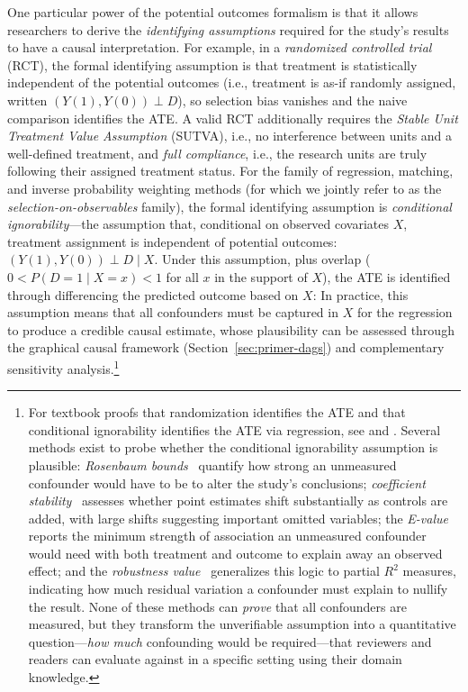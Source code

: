 One particular power of the potential outcomes formalism is that it allows researchers to derive the \emph{identifying assumptions} required for the study's results to have a causal interpretation.
For example, in a \emph{randomized controlled trial} (RCT), the formal identifying assumption is that treatment is statistically independent of the potential outcomes (i.e., treatment is as-if randomly assigned, written $(Y(1), Y(0)) \perp D$), so selection bias vanishes and the naive comparison identifies the ATE\@.
A valid RCT additionally requires the \emph{Stable Unit Treatment Value Assumption} (SUTVA), i.e., no interference between units and a well-defined treatment, and \emph{full compliance}, i.e., the research units are truly following their assigned treatment status.
For the family of regression, matching, and inverse probability weighting methods (for which we jointly refer to as the \emph{selection-on-observables} family), the formal identifying assumption is \emph{conditional ignorability}---the assumption that, conditional on observed covariates $X$, treatment assignment is independent of potential outcomes: $(Y(1), Y(0)) \perp D \mid X$.
Under this assumption, plus overlap ($0 < P(D\!=\!1 \mid X\!=\!x) < 1$ for all $x$ in the support of $X$), the ATE is identified through differencing the predicted outcome based on $X$:
In practice, this assumption means that all confounders must be captured in $X$ for the regression to produce a credible causal estimate, whose plausibility can be assessed through the graphical causal framework (Section~\ref{sec:primer-dags}) and complementary sensitivity analysis.\footnote{For textbook proofs that randomization identifies the ATE and that conditional ignorability identifies the ATE via regression, see \citet[Ch.~2]{angrist2009mostly} and \citet[Chs.~2--3]{hernan2020causal}.
Several methods exist to probe whether the conditional ignorability assumption is plausible:
\emph{Rosenbaum bounds}~\cite{rosenbaum2002observational} quantify how strong an unmeasured confounder would have to be to alter the study's conclusions;
\emph{coefficient stability}~\cite{oster2019unobservable} assesses whether point estimates shift substantially as controls are added, with large shifts suggesting important omitted variables;
the \emph{E-value}~\cite{vanderweele2017sensitivity} reports the minimum strength of association an unmeasured confounder would need with both treatment and outcome to explain away an observed effect;
and the \emph{robustness value}~\cite{cinelli2020making} generalizes this logic to partial $R^2$ measures, indicating how much residual variation a confounder must explain to nullify the result.
None of these methods can \emph{prove} that all confounders are measured, but they transform the unverifiable assumption into a quantitative question---\emph{how much} confounding would be required---that reviewers and readers can evaluate against in a specific setting using their domain knowledge.}

